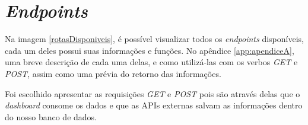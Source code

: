 \section{\textit{Endpoints}}
\indent
\par Na imagem \ref{rotasDisponiveis}, é possível visualizar todos os \textit{endpoints} disponíveis, cada um deles possui suas informações e funções. No apêndice \ref{app:apendiceA}, uma breve descrição de cada uma delas, e como utilizá-las com os verbos \textit{GET} e \textit{POST}, assim como uma prévia do retorno das informações.
\indent
\par Foi escolhido apresentar as requisições \textit{GET} e \textit{POST} pois são através delas que o \textit{dashboard} consome os dados e que as APIs externas salvam as informações dentro do nosso banco de dados.

